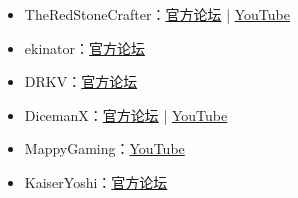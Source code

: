 \begin{itemize}
\item TheRedStoneCrafter：\href{https://forums.terraria.org/index.php?members/idkwhoiam129.57457/}{官方论坛} | \href{https://www.youtube.com/channel/UC9ekQoOvO3BgFQsmGdWJpCQ}{YouTube}
\item ekinator：\href{https://forums.terraria.org/index.php?members/ekinator.61186/}{官方论坛}
\item DRKV：\href{https://forums.terraria.org/index.php?members/drkv.67603/}{官方论坛}
\item DicemanX：\href{https://forums.terraria.org/index.php?members/dicemanx.1706/}{官方论坛} | \href{https://www.youtube.com/channel/UCllYBm-_FbqWuI92o6zPXfw}{YouTube}
\item MappyGaming：\href{https://www.youtube.com/channel/UC-u6c7ppGML6icciJ0Q1oWQ}{YouTube}
\item KaiserYoshi：\href{https://forums.terraria.org/index.php?members/kaiseryoshi.680/}{官方论坛}
\end{itemize}